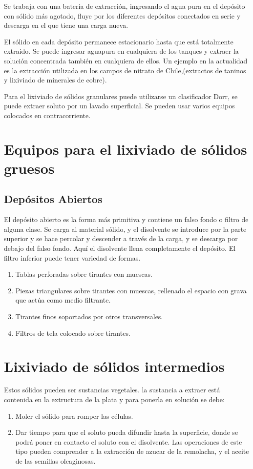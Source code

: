\documentclass[12pt,openany]{book}
\begin{document}
Se trabaja con una batería de extracción, ingresando el agua pura en el depósito con sólido más agotado, fluye por los
diferentes depósitos conectados en serie y descarga en el que tiene una carga nueva.

El sólido en cada depósito permanece estacionario hasta que está totalmente extraído. Se puede ingresar aguapura en 
cualquiera de los tanques y extraer la solución concentrada también en cualquiera de ellos. Un ejemplo en la actualidad
es la extracción utilizada en los campos de nitrato de Chile,(extractos de taninos y lixiviado de minerales de cobre).

Para el lixiviado de sólidos granulares puede utilizarse un clasificador Dorr, se puede extraer soluto por un lavado
superficial. Se pueden usar varios equipos colocados en contracorriente.

\section{Equipos para el lixiviado de sólidos gruesos}
\subsection{Depósitos Abiertos}
El depósito abierto es la forma más primitiva y contiene un falso fondo o filtro de alguna clase. Se carga
al material sólido, y el disolvente se introduce por la parte
superior y se hace percolar y descender a través de la carga, y
se descarga por debajo del falso fondo. Aquí el disolvente llena completamente
el depósito.
El filtro inferior puede tener variedad de formas.
\begin{enumerate}
    \item Tablas perforadas sobre tirantes con muescas.
    \item Piezas triangulares sobre tirantes con muescas, rellenado el espacio con
    grava que actúa como medio filtrante.
    \item Tirantes finos soportados por otros transversales.
    \item Filtros de tela colocado sobre tirantes.
\end{enumerate}


\section{Lixiviado de sólidos intermedios}

Estos sólidos pueden ser sustancias vegetales. la sustancia a 
extraer está contenida en la extructura de la plata y para ponerla en solución se debe:
\begin{enumerate}
    \item Moler el sólido para romper las células.
    \item Dar tiempo para que el soluto pueda difundir hasta la superficie, 
    donde se podrá poner en contacto el soluto con el disolvente. Las operaciones de este tipo 
    pueden comprender a la extracción de azucar de la remolacha, y el aceite de las semillas 
    oleaginosas.
\end{enumerate}
\end{document}
